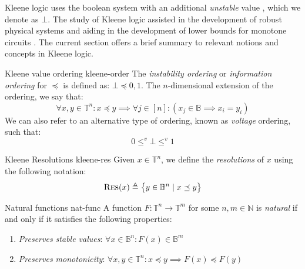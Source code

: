 Kleene logic uses the boolean system with an additional \textit{unstable} value \cite{kleene_IntroductionMetamathematics_2009},
which we denote as $\bot$.
The study of Kleene logic assisted in
the development of robust physical systems \cite{friedrichs_MetastabilityContainingCircuits_2018} and
aiding in the development of lower bounds for monotone circuits
\cite{eichelberger_HazardDetectionCombinational_1965, ikenmeyer_ComplexityHazardfreeCircuits_2019,ikenmeyer_KarchmerWigdersonGamesHazardfree_2022,  bund_SmallHazardFreeTransducers_2025}.
The current section offers a brief summary to relevant notions and concepts in Kleene logic.

\begin{definitionbox}{Kleene value ordering \cite{mukaidono_BternaryLogicFunction_1972,ikenmeyer_ComplexityHazardfreeCircuits_2019}}{kleene-order}
    The \textit{instability ordering} or \textit{information ordering} for $\preceq$ is defined as: $\bot \preceq 0,1$. The $n$-dimensional
    extension of the ordering, we say that:
    $$
        \forall x,y \in \mathbb{T}^n: x \preceq y \implies \forall j \in [n]: (x_j \in \mathbb{B} \implies x_i = y_i)
    $$
    We can also refer to an alternative type of ordering, known as \textit{voltage} ordering, such that:
    $$
        0 \leq^v \bot \leq^v 1
    $$
\end{definitionbox}


\begin{definitionbox}{Kleene Resolutions \cite{mukaidono_BternaryLogicFunction_1972, ikenmeyer_ComplexityHazardfreeCircuits_2019}}{kleene-res}
    Given $x \in \mathbb{T}^n$, we define the \textit{resolutions} of $x$ using the following notation:
    $$
        \textnormal{\textsc{Res}}(x) \triangleq \big\{ y \in \mathbb{B}^n \mid x \preceq y  \big\}
    $$
\end{definitionbox}


\begin{definitionbox}{Natural functions \cite{ikenmeyer_ComplexityHazardfreeCircuits_2019}}{nat-func}
    A function $F: \mathbb{T}^n \to \mathbb{T}^m$ for some $n, m \in \mathbb{N}$ is \textit{natural} if and only
    if it satisfies the following properties:
    \begin{enumerate}
        \item \textit{Preserves stable values}: $\forall x \in \mathbb{B}^n: F(x) \in \mathbb{B}^m$
        \item \textit{Preserves monotonicity}: $\forall x,y \in \mathbb{T}^n: x \preceq y \implies F(x) \preceq F(y)$
    \end{enumerate}
\end{definitionbox}

